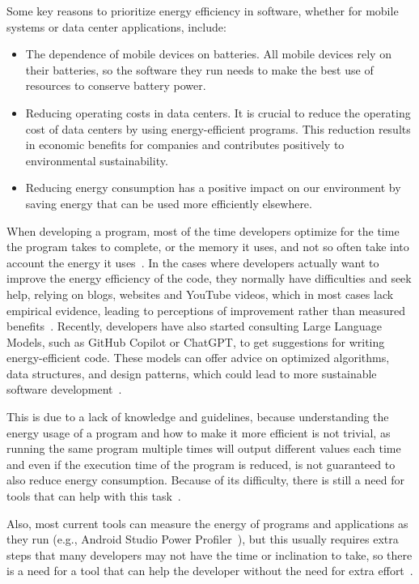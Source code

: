 Some key reasons to prioritize energy efficiency in software, whether for mobile systems or data center applications, include:

\begin{itemize}
  \item The dependence of mobile devices on batteries. All mobile devices rely on their batteries, so the software they run needs to make the best use of resources to conserve battery power.
  \item Reducing operating costs in data centers. It is crucial to reduce the operating cost of data centers by using energy-efficient programs. This reduction results in economic benefits for companies and contributes positively to environmental sustainability. 
  \item Reducing energy consumption has a positive impact on our environment by saving energy that can be used more efficiently elsewhere. 
\end{itemize}

When developing a program, most of the time developers optimize for the time the program takes to complete, or the memory it uses, and not so often take into account the energy it uses~\cite{10.1145/1666420.1666438}. 
In the cases where developers actually want to improve the energy efficiency of the code, they normally have difficulties and seek help, relying on blogs, websites and YouTube videos, which in most cases lack empirical evidence, leading to perceptions of improvement rather than measured benefits~\cite{10.1145/3154384}.
Recently, developers have also started consulting Large Language Models, such as GitHub Copilot or ChatGPT, to get suggestions for writing energy-efficient code. These models can offer advice on optimized algorithms, data structures, and design patterns, which could lead to more sustainable software development~\cite{vartziotis2024carbon,rani2025can}.

This is due to a lack of knowledge and guidelines, because understanding the energy usage of a program and how to make it more efficient is not trivial, as running the same program multiple times will output different values each time and even if the execution time of the program is reduced, is not guaranteed to also reduce energy consumption. Because of its difficulty, there is still a need for tools that can help with this task~\cite{10.1145/2597073.2597110}. 

Also, most current tools can measure the energy of programs and applications as they run (e.g., Android Studio Power Profiler~\cite{android_power_profiler}), but this usually requires extra steps that many developers may not have the time or inclination to take, so there is a need for a tool that can help the developer without the need for extra effort~\cite{10.1145/3154384}.

